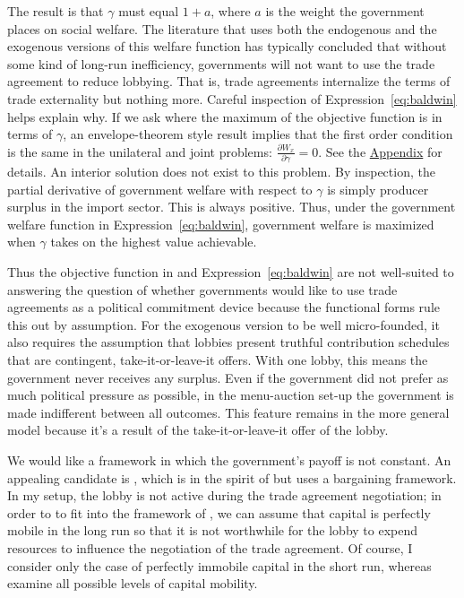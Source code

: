 \documentclass[12pt,titlepage]{article}
\newcommand{\ga}{\gamma}
\begin{document}
The \Textcite{gh94} result is that $\ga$ must equal $1+a$, where $a$ is the weight the government places on social welfare. The literature that uses both the endogenous and the exogenous versions of this welfare function has typically concluded that without some kind of long-run inefficiency, governments will not want to use the trade agreement to reduce lobbying. That is, trade agreements internalize the terms of trade externality but nothing more. Careful inspection of Expression~\ref{eq:baldwin} helps explain why. If we ask where the maximum of the objective function is in terms of $\ga$, an envelope-theorem style result implies that the first order condition is the same in the unilateral and joint problems: $\displaystyle \frac{\partial W_x}{\partial \ga} = 0$. See the \hyperlink{envelope}{Appendix} for details. An interior solution does not exist to this problem. By inspection, the partial derivative of government welfare with respect to $\ga$ is simply producer surplus in the import sector. This is always positive. Thus, under the government welfare function in Expression~\ref{eq:baldwin}, government welfare is maximized when $\ga$ takes on the highest value achievable.

Thus the objective function in \Textcite{gh94} and Expression~\ref{eq:baldwin} are not well-suited to answering the question of whether governments would like to use trade agreements as a political commitment device because the functional forms rule this out by assumption. For the exogenous version to be well micro-founded, it also requires the assumption that lobbies present truthful contribution schedules that are contingent, take-it-or-leave-it offers. With one lobby, this means the government never receives any surplus. Even if the government did not prefer as much political pressure as possible, in the menu-auction set-up the government is made indifferent between all outcomes. This feature remains in the more general \Textcite{dgh97} model because it's a result of the take-it-or-leave-it offer of the lobby.

We would like a framework in which the government's payoff is not constant. An appealing candidate is \Textcite{mrc2007}, which is in the spirit of \Textcite{gh94} but uses a bargaining framework. In my setup, the lobby is not active during the trade agreement negotiation; in order to to fit into the framework of \Textcite{mrc2007}, we can assume that capital is perfectly mobile in the long run so that it is not worthwhile for the lobby to expend resources to influence the negotiation of the trade agreement. Of course, I consider only the case of perfectly immobile capital in the short run, whereas \Textcite{mrc2007} examine all possible levels of capital mobility.
\end{document}
